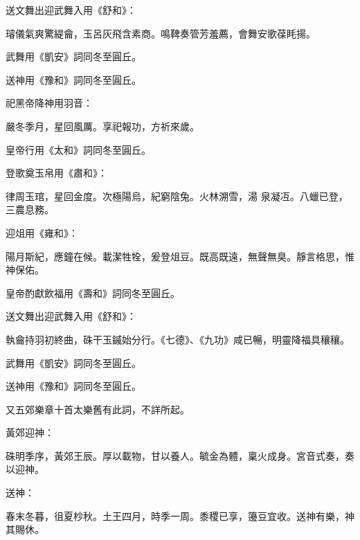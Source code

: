\begin{pinyinscope}
 送文舞出迎武舞入用《舒和》：



 璿儀氣爽驚緹龠，玉呂灰飛含素商。鳴鞞奏管芳羞薦，會舞安歌葆眊揚。



 武舞用《凱安》詞同冬至圓丘。



 送神用《豫和》詞同冬至圓丘。



 祀黑帝降神用羽音：



 嚴冬季月，星回風厲。享祀報功，方祈來歲。



 皇帝行用《太和》詞同冬至圓丘。



 登歌奠玉帛用《肅和》：



 律周玉琯，星回金度。次極陽烏，紀窮陰兔。火林溯雪，湯
 泉凝冱。八蠟已登，三農息務。



 迎俎用《雍和》：



 陽月斯紀，應鐘在候。載潔牲牷，爰登俎豆。既高既遠，無聲無臭。靜言格思，惟神保佑。



 皇帝酌獻飲福用《壽和》詞同冬至圓丘。



 送文舞出迎武舞入用《舒和》：



 執龠持羽初終曲，硃干玉鏚始分行。《七德》、《九功》咸已暢，明靈降福具穰穰。



 武舞用《凱安》詞同冬至圓丘。



 送神用《豫和》詞同冬至圓丘。



 又五郊樂章十首太樂舊有此詞，不詳所起。



 黃郊迎神：



 硃明季序，黃郊王辰。厚以載物，甘以養人。毓金為體，稟火成身。宮音式奏，奏以迎神。



 送神：



 春末冬暮，徂夏杪秋。土王四月，時季一周。黍稷已享，籩豆宜收。送神有樂，神其賜休。




\end{pinyinscope}
